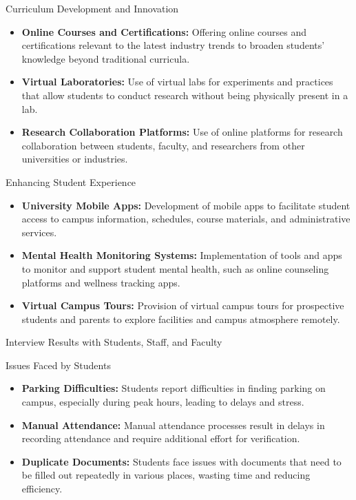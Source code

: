 \documentclass[aspectratio=169, table]{beamer}
\begin{document}
\begin{frame}{Curriculum Development and Innovation}
	\begin{itemize}
		\item \textbf{Online Courses and Certifications:} Offering online courses and certifications relevant to the latest industry trends to broaden students' knowledge beyond traditional curricula.
		\item \textbf{Virtual Laboratories:} Use of virtual labs for experiments and practices that allow students to conduct research without being physically present in a lab.
		\item \textbf{Research Collaboration Platforms:} Use of online platforms for research collaboration between students, faculty, and researchers from other universities or industries.
	\end{itemize}
\end{frame}

\begin{frame}{Enhancing Student Experience}
	\begin{itemize}
		\item \textbf{University Mobile Apps:} Development of mobile apps to facilitate student access to campus information, schedules, course materials, and administrative services.
		\item \textbf{Mental Health Monitoring Systems:} Implementation of tools and apps to monitor and support student mental health, such as online counseling platforms and wellness tracking apps.
		\item \textbf{Virtual Campus Tours:} Provision of virtual campus tours for prospective students and parents to explore facilities and campus atmosphere remotely.
	\end{itemize}
\end{frame}

\begin{frame}
	\centering
	\Huge Interview Results with Students, Staff, and Faculty
\end{frame}

\begin{frame}{Issues Faced by Students}
	\begin{itemize}
		\item \textbf{Parking Difficulties:} Students report difficulties in finding parking on campus, especially during peak hours, leading to delays and stress.
		\item \textbf{Manual Attendance:} Manual attendance processes result in delays in recording attendance and require additional effort for verification.
		\item \textbf{Duplicate Documents:} Students face issues with documents that need to be filled out repeatedly in various places, wasting time and reducing efficiency.
	\end{itemize}
\end{frame}
\end{document}
